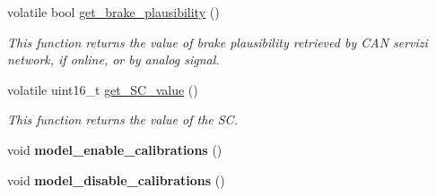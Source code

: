 \begin{DoxyCompactItemize}
volatile bool \hyperlink{group___board__model__group_gad47b702f79115e19d75b22f39b45efeb}{get\-\_\-brake\-\_\-plausibility} ()
\begin{DoxyCompactList}\small\item\em This function returns the value of brake plausibility retrieved by C\-A\-N servizi network, if online, or by analog signal. \end{DoxyCompactList}\item 
volatile uint16\-\_\-t \hyperlink{group___board__model__group_ga36eddbc000c8d1820fd2a644a39c87ea}{get\-\_\-\-S\-C\-\_\-value} ()
\begin{DoxyCompactList}\small\item\em This function returns the value of the S\-C. \end{DoxyCompactList}\item 
\hypertarget{group___board__model__group_ga56b9cca331f294c3249df72b9f37ff2a}{void {\bfseries model\-\_\-enable\-\_\-calibrations} ()}\label{group___board__model__group_ga56b9cca331f294c3249df72b9f37ff2a}

\item 
\hypertarget{group___board__model__group_ga8ce089b65afda1dee23f7ecefd0cb873}{void {\bfseries model\-\_\-disable\-\_\-calibrations} ()}\label{group___board__model__group_ga8ce089b65afda1dee23f7ecefd0cb873}

\end{DoxyCompactItemize}
